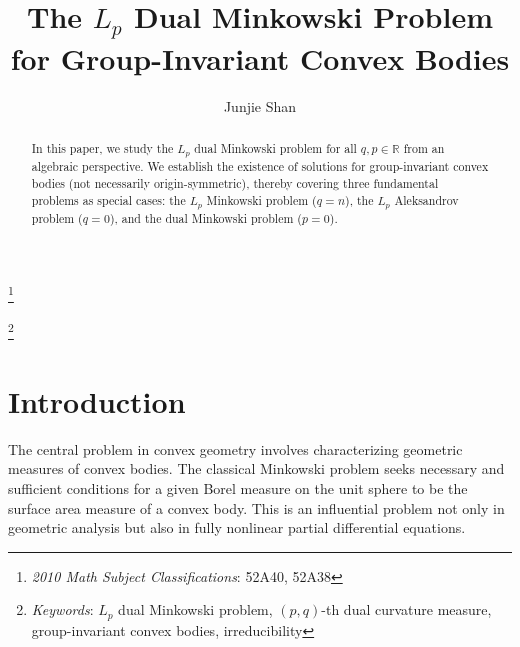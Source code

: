 \documentclass[12pt, reqno]{amsart}
\theoremstyle{definition}
\theoremstyle{remark}
\numberwithin{equation}{section}
\begin{document}
	
	\title{The  $L_{p}$ Dual  Minkowski  Problem for Group-Invariant Convex Bodies  }
	
	\author{Junjie Shan }
	
	\address{School of Mathematics, Sichuan University, Chengdu, Sichuan, 610064, P. R. China}
	
	
	
	
	
	
	
	\thanks{{\it 2010 Math Subject Classifications}:  52A40, 52A38}
	
	\thanks{{\it Keywords}:   $L_{p}$ dual Minkowski problem, $(p, q)$-th dual curvature measure, group-invariant convex bodies, irreducibility}
	
	
	
	
	
	
	\begin{abstract}
	In this paper, we study the $L_p$ dual Minkowski problem for all $q, p \in \mathbb{R}$ from an algebraic perspective. We establish the existence of solutions for group-invariant convex bodies (not necessarily origin-symmetric), thereby covering three fundamental problems as special cases: the $L_p$ Minkowski problem ($q = n$), the $L_p$ Aleksandrov problem ($q = 0$), and the dual Minkowski problem ($p = 0$).
	\end{abstract}
	
	\maketitle
	   
	  \section{Introduction} 
	  The central problem in convex geometry involves characterizing geometric measures  of convex bodies. The classical Minkowski problem seeks necessary and sufficient conditions for a given Borel measure on the unit sphere to be the surface area measure of a convex body. This is an influential problem not only in geometric analysis but also in fully nonlinear partial differential equations.
	  
\end{document}
